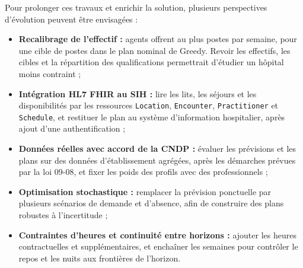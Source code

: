 \indent Pour prolonger ces travaux et enrichir la solution, plusieurs perspectives d'évolution peuvent être envisagées :
\begin{itemize}
    \item \textbf{Recalibrage de l'effectif :} \NbAgents{} agents offrent au plus \CapacitePostes{} postes par semaine, pour une cible de \CibleSz{} postes dans le plan nominal de Greedy. Revoir les effectifs, les cibles et la répartition des qualifications permettrait d'étudier un hôpital moins contraint ;
    \item \textbf{Intégration HL7 FHIR au SIH :} lire les lits, les séjours et les disponibilités par les ressources \texttt{Location}, \texttt{Encounter}, \texttt{Practitioner} et \texttt{Schedule}, et restituer le plan au système d'information hospitalier, après ajout d'une authentification ;
    \item \textbf{Données réelles avec accord de la CNDP :} évaluer les prévisions et les plans sur des données d'établissement agrégées, après les démarches prévues par la loi 09-08, et fixer les poids des profils avec des professionnels ;
    \item \textbf{Optimisation stochastique :} remplacer la prévision ponctuelle par plusieurs scénarios de demande et d'absence, afin de construire des plans robustes à l'incertitude ;
    \item \textbf{Contraintes d'heures et continuité entre horizons :} ajouter les heures contractuelles et supplémentaires, et enchaîner les semaines pour contrôler le repos et les nuits aux frontières de l'horizon.
\end{itemize}

\endgroup
